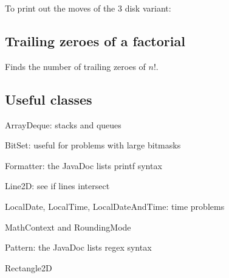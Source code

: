 To print out the moves of the 3 disk variant:



\subsection*{Trailing zeroes of a factorial}

Finds the number of trailing zeroes of $n!$.



\subsection*{Useful classes}

ArrayDeque: stacks and queues

BitSet: useful for problems with large bitmasks

Formatter: the JavaDoc lists printf syntax

Line2D: see if lines intersect

LocalDate, LocalTime, LocalDateAndTime: time problems

MathContext and RoundingMode

Pattern: the JavaDoc lists regex syntax

Rectangle2D

\newpage